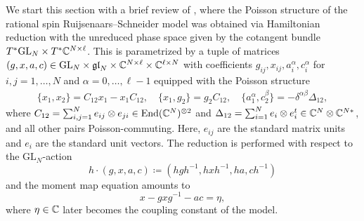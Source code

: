 We start this section with a brief review of \cite{arutyunov_hamiltonian_1998}, where the Poisson structure of the rational spin Ruijsenaars--Schneider model was obtained via Hamiltonian reduction with the unreduced phase space given by the cotangent bundle $T^* \mathrm{GL}_N \times T^* \mathbb{C}^{N \times \ell}$. This is parametrized by a tuple of matrices $(g,x,a,c) \in \mathrm{GL}_N \times \mathfrak{gl}_N \times \mathbb{C}^{N \times \ell} \times \mathbb{C}^{\ell \times N}$ with coefficients $g_{ij},x_{ij},a_i^\alpha,c_i^\alpha$ for $i,j=1,\dots,N$ and $\alpha=0,\dots,\ell-1$ equipped with the Poisson structure
\begin{align}
\{ x_1,x_2 \} = C_{12} x_1-x_1 C_{12}, \quad \{ x_1,g_2 \} = g_2 C_{12}, \quad \{ a_1^\alpha,c_2^\beta \} = - \delta^{\alpha\beta} \Delta_{12},
\end{align}
where $C_{12} = \sum_{i,j=1}^N e_{ij} \otimes e_{ji} \in \operatorname{End}(\mathbb{C}^N)^{\otimes 2}$ and $\Delta_{12} = \sum_{i=1}^N e_i \otimes e_i^t \in \mathbb{C}^N \otimes \mathbb{C}^{N*}$, and all other pairs Poisson-commuting. Here, $e_{ij}$ are the standard matrix units and $e_i$ are the standard unit vectors. The reduction is performed with respect to the $\mathrm{GL}_N$-action
\begin{equation}
h \cdot (g,x,a,c) \coloneq (hgh^{-1},hxh^{-1},ha,ch^{-1})
\end{equation}
and the moment map equation amounts to
\begin{equation}
x - gxg^{-1} - ac = \eta,
\end{equation}
where $\eta \in \mathbb{C}$ later becomes the coupling constant of the model.

